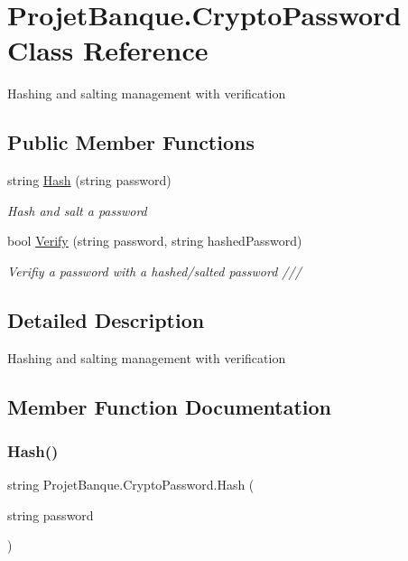 \hypertarget{class_projet_banque_1_1_crypto_password}{}\section{Projet\+Banque.\+Crypto\+Password Class Reference}
\label{class_projet_banque_1_1_crypto_password}


Hashing and salting management with verification  


\subsection*{Public Member Functions}
\begin{DoxyCompactItemize}
\item 
string \mbox{\hyperlink{class_projet_banque_1_1_crypto_password_ac69cba02df805e603f45c28858ecf05e}{Hash}} (string password)
\begin{DoxyCompactList}\small\item\em Hash and salt a password \end{DoxyCompactList}\item 
bool \mbox{\hyperlink{class_projet_banque_1_1_crypto_password_a386f50e2b9d7b64fb52a3f56a638a2bd}{Verify}} (string password, string hashed\+Password)
\begin{DoxyCompactList}\small\item\em Verifiy a password with a hashed/salted password /// \end{DoxyCompactList}\end{DoxyCompactItemize}


\subsection{Detailed Description}
Hashing and salting management with verification 



\subsection{Member Function Documentation}
\mbox{\label{class_projet_banque_1_1_crypto_password_ac69cba02df805e603f45c28858ecf05e}} 
\subsubsection{\texorpdfstring{Hash()}{Hash()}}
{\footnotesize\ttfamily string Projet\+Banque.\+Crypto\+Password.\+Hash (\begin{DoxyParamCaption}\item[{string}]{password }\end{DoxyParamCaption})}



